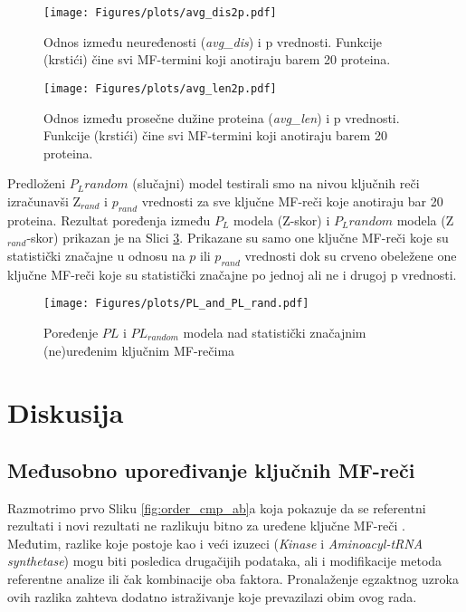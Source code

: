 \begin{figure}[th]
  \centering
\texttt{[image: Figures/plots/avg\_dis2p.pdf]}
\caption {
  Odnos između neuređenosti (\textit{avg\_dis}) i p vrednosti.
  Funkcije (krstići) čine svi MF-termini koji anotiraju barem 20 proteina.
}
\label{fig:avg_dis_vs_p}
\end{figure}

\begin{figure}[th]
  \centering
\texttt{[image: Figures/plots/avg\_len2p.pdf]}
\caption {
  Odnos između prosečne dužine proteina (\textit{avg\_len}) i p vrednosti.
  Funkcije (krstići) čine svi MF-termini koji anotiraju barem 20 proteina.
}
\label{fig:avg_len_vs_p}
\end{figure}



Predloženi $P_L random$ (slučajni) model testirali smo na nivou ključnih reči
izračunavši Z$_{rand}$ i  $p_{rand}$ vrednosti za sve ključne MF-reči  koje
anotiraju bar 20 proteina. Rezultat poređenja između $P_L$
modela (Z-skor) i $P_L random$ modela (Z$_{rand}$-skor) prikazan je na Slici
\ref{fig:PLrand}. Prikazane su samo one ključne MF-reči  koje su statistički
značajne u odnosu na $p$ ili $p_{rand}$ vrednosti dok su crveno obeležene one
ključne MF-reči koje su statistički značajne po jednoj ali ne i drugoj p
vrednosti.


\begin{figure}[th]
\hspace*{-2.7cm} 
\centering
\texttt{[image: Figures/plots/PL\_and\_PL\_rand.pdf]}
\caption {
  Poređenje $PL$ i $PL_{random}$ modela nad statistički značajnim (ne)uređenim ključnim MF-rečima 
}
\label{fig:PLrand}
\end{figure}




\chapter{Diskusija} %

\label{Diskusija} %

\section{Međusobno upoređivanje ključnih MF-reči }

Razmotrimo prvo Sliku \ref{fig:order_cmp_ab}a koja pokazuje da se referentni
rezultati i novi rezultati ne razlikuju bitno za uređene ključne
MF-reči . Međutim, razlike koje postoje kao i veći izuzeci (\textit{Kinase} i
\textit{Aminoacyl-tRNA synthetase})  mogu biti posledica drugačijih podataka,
ali i modifikacije metoda referentne analize ili čak kombinacije oba faktora.
Pronalaženje egzaktnog uzroka ovih razlika zahteva dodatno istraživanje koje
prevazilazi obim ovog rada.

